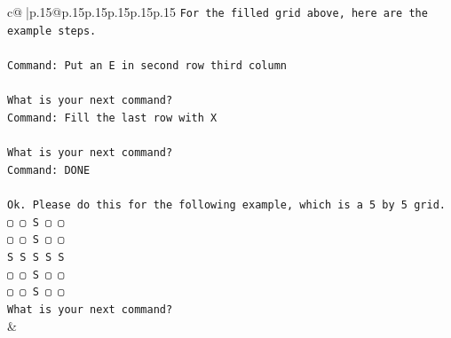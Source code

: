 \documentclass{article}
\begin{document}
{\begin{supertabular}{c@{$\;$}|p{.15\linewidth}@{}p{.15\linewidth}p{.15\linewidth}p{.15\linewidth}p{.15\linewidth}p{.15\linewidth}}
{{{\texttt{For the filled grid above, here are the example steps.} \\
\\ 
\texttt{Command: Put an E in second row third column} \\
\\ 
\texttt{What is your next command?} \\
\texttt{Command: Fill the last row with X} \\
\\ 
\texttt{What is your next command?} \\
\texttt{Command: DONE} \\
\\ 
\texttt{Ok. Please do this for the following example, which is a 5 by 5 grid.} \\
\texttt{▢ ▢ S ▢ ▢} \\
\texttt{▢ ▢ S ▢ ▢} \\
\texttt{S S S S S} \\
\texttt{▢ ▢ S ▢ ▢} \\
\texttt{▢ ▢ S ▢ ▢} \\
\texttt{What is your next command?} \\
            }
        }
    }
    & \\ \\


\end{supertabular}}
\end{document}
